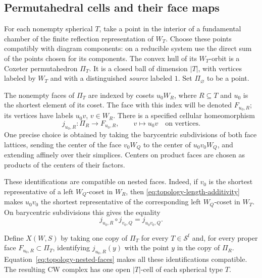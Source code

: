 \subsection{Permutahedral cells and their face maps}

For each nonempty spherical $T$, take a point in the interior of a
fundamental chamber of the finite reflection representation of $W_T$.
Choose these points compatibly with diagram components: on a reducible
system use the direct sum of the points chosen for its components.
The convex hull of its $W_T$-orbit is a Coxeter permutahedron $\Pi_T$.
It is a closed ball of dimension $|T|$, with vertices labeled by
$W_T$ and with a distinguished \emph{source} labeled $1$.
Set $\Pi_{\varnothing}$ to be a point.

The nonempty faces of $\Pi_T$ are indexed by cosets $u_0W_R$, where
$R\subseteq T$ and $u_0$ is the shortest element of its coset.
The face with this index will be denoted $F_{u_0,R}$; its vertices
have labels $u_0v$, $v\in W_R$.  There is a specified cellular
homeomorphism
\begin{equation}
  j_{u_0,R}\colon \Pi_R\longrightarrow F_{u_0,R},
  \qquad v\longmapsto u_0v
  \quad\text{on vertices}.
  \label{eq:topology-face-identification}
\end{equation}
One precise choice is obtained by taking the barycentric subdivisions
of both face lattices, sending the center of the face $v_0W_Q$ to the
center of $u_0v_0W_Q$, and extending affinely over their simplices.
Centers on product faces are chosen as products of the centers of
their factors.

These identifications are compatible on nested faces.  Indeed, if
$v_0$ is the shortest representative of a left $W_Q$-coset in $W_R$,
then \eqref{eq:topology-length-additivity} makes $u_0v_0$ the shortest
representative of the corresponding left $W_Q$-coset in $W_T$.
On barycentric subdivisions this gives the equality
\begin{equation}
  j_{u_0,R}\circ j_{v_0,Q}=j_{u_0v_0,Q}.
  \label{eq:topology-nested-faces}
\end{equation}

Define $X(W,S)$ by taking one copy of $\Pi_T$ for every
$T\in\mathcal S^{\mathrm f}$ and, for every proper face
$F_{u_0,R}\subset\Pi_T$, identifying $j_{u_0,R}(y)$ with the point
$y$ in the copy of $\Pi_R$.  Equation~\eqref{eq:topology-nested-faces}
makes all these identifications compatible.  The resulting CW complex
has one open $|T|$-cell of each spherical type $T$.

